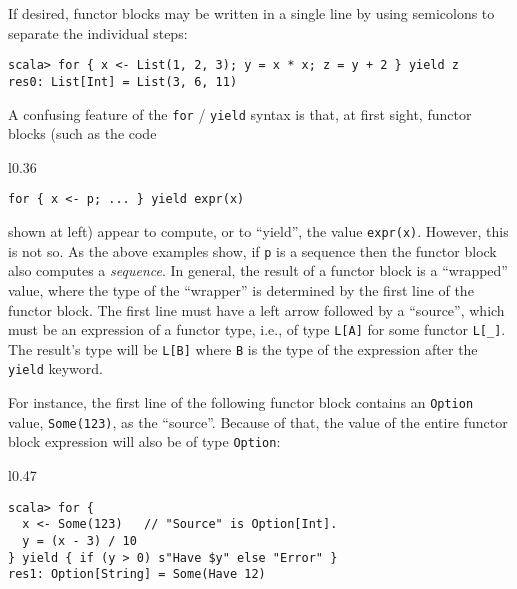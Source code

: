 If desired, functor blocks may be written in a single line by using
semicolons to separate the individual steps:
\begin{lstlisting}
scala> for { x <- List(1, 2, 3); y = x * x; z = y + 2 } yield z
res0: List[Int] = List(3, 6, 11)
\end{lstlisting}

A confusing feature of the \lstinline!for! / \lstinline!yield! syntax
is that, at first sight, functor blocks (such as the code\begin{wrapfigure}{l}{0.36\columnwidth}%
\vspace{-0.8\baselineskip}
\begin{lstlisting}
for { x <- p; ... } yield expr(x)
\end{lstlisting}

\vspace{-0.8\baselineskip}
\end{wrapfigure}%
 shown at left) appear to compute, or to \textsf{``}yield\textsf{''}, the value \lstinline!expr(x)!.
However, this is not so. As the above examples show, if \lstinline!p!
is a sequence then the functor block also computes a \emph{sequence}.
In general, the result of a functor block is a \textsf{``}wrapped\textsf{''} value,
where the type of the \textsf{``}wrapper\textsf{''} is determined by the first line
of the functor block. The first line must have a left arrow followed
by a \textsf{``}source\textsf{''}, which must be an expression
of a functor type, i.e., of type \lstinline!L[A]! for some functor
\lstinline!L[_]!. The result\textsf{'}s type will be \lstinline!L[B]! where
\lstinline!B! is the type of the expression after the \lstinline!yield!
keyword.

For instance, the first line of the following functor block contains
an \lstinline!Option! value, \lstinline!Some(123)!, as the \textsf{``}source\textsf{''}.
Because of that, the value of the entire functor block expression
will also be of type \lstinline!Option!:

\begin{wrapfigure}{l}{0.47\columnwidth}%
\vspace{-0.85\baselineskip}
\begin{lstlisting}
scala> for {
  x <- Some(123)   // "Source" is Option[Int].
  y = (x - 3) / 10
} yield { if (y > 0) s"Have $y" else "Error" }
res1: Option[String] = Some(Have 12)
\end{lstlisting}

\vspace{-1.2\baselineskip}
\end{wrapfigure}%

